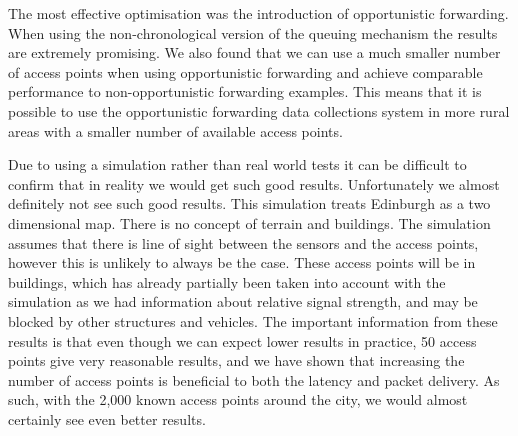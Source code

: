         The most effective optimisation was the introduction of opportunistic forwarding. When using the non-chronological version of the queuing mechanism the results are extremely promising. We also found that we can use a much smaller number of access points when using opportunistic forwarding and achieve comparable performance to non-opportunistic forwarding examples. This means that it is possible to use the opportunistic forwarding data collections system in more rural areas with a smaller number of available access points.

        Due to using a simulation rather than real world tests it can be difficult to confirm that in reality we would get such good results. Unfortunately we almost definitely not see such good results. This simulation treats Edinburgh as a two dimensional map. There is no concept of terrain and buildings. The simulation assumes that there is line of sight between the sensors and the access points, however this is unlikely to always be the case. These access points will be in buildings, which has already partially been taken into account with the simulation as we had information about relative signal strength, and may be blocked by other structures and vehicles. The important information from these results is that even though we can expect lower results in practice, 50 access points give very reasonable results, and we have shown that increasing the number of access points is beneficial to both the latency and packet delivery. As such, with the 2,000 known access points around the city, we would almost certainly see even better results.

